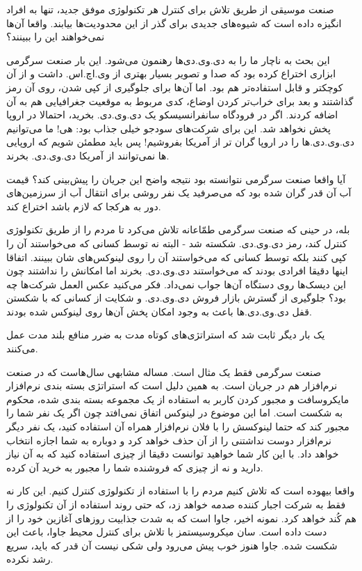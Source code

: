 صنعت موسیقی از طریق تلاش برای کنترل هر تکنولوژی موفق جدید، تنها به
افراد انگیزه داده است که شیوه‌های جدیدی برای گذر از این محدودیت‌ها
بیابند. واقعا آن‌ها نمی‌خواهند این را ببینند؟

این بحث به ناچار ما را به دی.وی.دی‌ها رهنمون می‌شود. این بار صنعت سرگرمی
ابزاری اختراع کرده بود که صدا و تصویر بسیار بهتری از وی.اچ.اس. داشت و
از آن کوچکتر و قابل استفاده‌تر هم بود. اما آن‌ها برای جلوگیری از کپی
شدن، روی آن رمز گذاشتند و بعد برای خراب‌تر کردن اوضاع، کدی مربوط به
موقعیت جغرافیایی هم به آن اضافه کردند. اگر در فرودگاه سانفرانسیسکو یک
دی.وی.دی. بخرید، احتمالا در اروپا پخش نخواهد شد. این برای شرکت‌های
سودجو خیلی جذاب بود: هی! ما می‌توانیم دی.وی.دی.ها را در اروپا گران تر
از آمریکا بفروشیم! پس باید مطمئن شویم که اروپایی ها نمی‌توانند از
آمریکا دی.وی.دی. بخرند.

آیا واقعا صنعت سرگرمی نتوانسته بود نتیجه واضح این جریان را پیش‌بینی
کند؟ قیمت آب آن قدر گران شده بود که می‌صرفید یک نفر روشی برای انتقال آب
از سرزمین‌های دور به هرکجا که لازم باشد اختراع کند.

بله، در حینی که صنعت سرگرمی طمّاعانه تلاش می‌کرد تا مردم را از طریق
تکنولوژی کنترل کند، رمز دی.وی.دی. شکسته شد - البته نه توسط کسانی که
می‌خواستند آن را کپی کنند بلکه توسط کسانی که می‌خواستند آن را روی
لینوکس‌های شان ببینند. اتفاقا اینها دقیقا افرادی بودند که می‌خواستند
دی.وی.دی. بخرند اما امکانش را نداشتند چون این دیسک‌ها روی دستگاه آن‌ها
جواب نمی‌داد. فکر می‌کنید عکس العمل شرکت‌ها چه بود؟ جلوگیری از گسترش
بازار فروش دی.وی.دی. و شکایت از کسانی که با شکستن قفل دی.وی.دی.ها باعث
به وجود امکان پخش آن‌ها روی لینوکس شده بودند.

یک بار دیگر ثابت شد که استراتژی‌های کوتاه مدت به ضرر منافع بلند مدت عمل
می‌کنند.

صنعت سرگرمی فقط یک مثال است. مساله مشابهی سال‌هاست که در صنعت نرم‌افزار
هم در جریان است. به همین دلیل است که استراتژی بسته بندی نرم‌افزار
مایکروسافت و مجبور کردن کاربر به استفاده از یک مجموعه بسته بندی شده،
محکوم به شکست است. اما این موضوع در لینوکس اتفاق نمی‌افتد چون اگر یک
نفر شما را مجبور کند که حتما لینوکسش را با فلان نرم‌افزار همراه آن
استفاده کنید، یک نفر دیگر نرم‌افزار دوست نداشتنی را از آن حذف خواهد کرد
و دوباره به شما اجازه انتخاب خواهد داد. با این کار شما خواهید توانست
دقیقا از چیزی استفاده کنید که به آن نیاز دارید و نه از چیزی که فروشنده
شما را مجبور به خرید آن کرده.

واقعا بیهوده است که تلاش کنیم مردم را با استفاده از تکنولوژی کنترل
کنیم. این کار نه فقط به شرکت اجبار کننده صدمه خواهد زد، که حتی روند
استفاده از آن تکنولوژی را هم کُند خواهد کرد. نمونه اخیر، جاوا است که به
شدت جذابیت روزهای آغازین خود را از دست داده است. سان میکروسیستمز با
تلاش برای کنترل محیط جاوا، باعث این شکست شده. جاوا هنوز خوب پیش می‌رود
ولی شکی نیست آن قدر که باید، سریع رشد نکرده.

